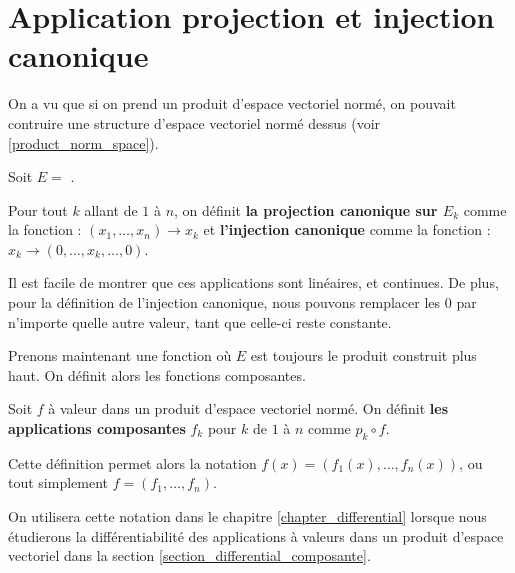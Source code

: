 \section{Application projection et injection canonique}

On a vu que si on prend un produit d'espace vectoriel normé, on pouvait
contruire une structure d'espace vectoriel normé dessus (voir \ref{product_norm_space}).

Soit $E = $ .
\begin{definition}
	Pour tout $k$ allant de $1$ à $n$, on définit \textbf{la projection
		canonique sur $E_{k}$} comme la fonction
		 : $(x_{1}, \ldots, x_{n}) \rightarrow
		x_{k}$ et \textbf{l'injection canonique}
		comme la fonction  : $x_{k}
		\rightarrow (0, \ldots, x_{k}, \ldots, 0)$.
	\label{injection_projection_definition}
\end{definition}

Il est facile de montrer que ces applications sont linéaires, et continues.
De plus, pour la définition de l'injection canonique, nous pouvons remplacer les
$0$ par n'importe quelle autre valeur, tant que celle-ci reste constante.

Prenons maintenant une fonction  où $E$ est toujours
le produit construit plus haut.
On définit alors les fonctions composantes.

\begin{definition}
	\label{composante_function}
	Soit $f$ à valeur dans un produit d'espace vectoriel normé. On définit
	\textbf{les applications composantes} $f_{k}$ pour $k$ de $1$ à $n$ comme
	$p_{k} \circ f$.
\end{definition}

Cette définition permet alors la notation $f(x) = (f_{1}(x), \ldots, f_{n}(x))$,
ou tout simplement $f = (f_{1}, \ldots, f_{n})$.

On utilisera cette notation dans le chapitre \ref{chapter_differential} lorsque nous
étudierons la différentiabilité des applications à valeurs dans un produit
d'espace vectoriel dans la section \ref{section_differential_composante}.
